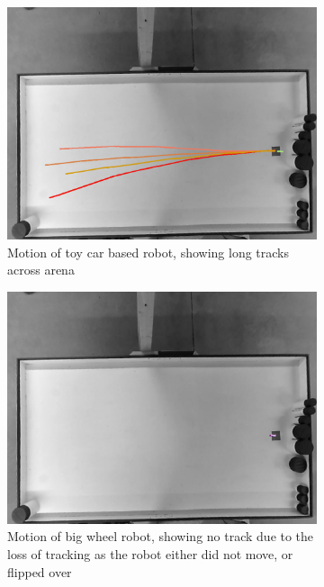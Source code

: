 \begin{figure}[h]
	\centering
	\begin{subfigure}[t]{0.47\textwidth}
		\includegraphics[width=\textwidth]{../hardwareX_paper/robot_17.png}
		\caption{Motion of toy car based robot, showing long tracks across arena\label{fig:car_motion}}
	\end{subfigure}
	\begin{subfigure}[t]{0.47\textwidth}
		\includegraphics[width=\textwidth]{../hardwareX_paper/robot_1.png}
		\caption{Motion of big wheel robot, showing no track due to the loss of tracking as the robot either did not move, or flipped over\label{fig:big_wheel_motion}}
	\end{subfigure}
	\caption{} %
\end{figure}

